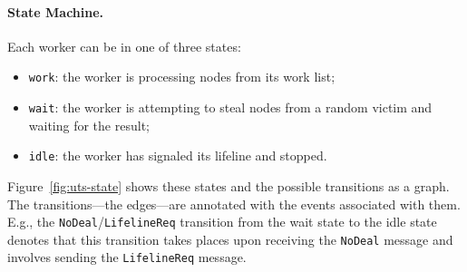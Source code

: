 \paragraph{State Machine.} Each worker can be in one of three states:
\begin{itemize}
\item \lstinline{work}: the worker is processing nodes from its work list;
\item \lstinline{wait}: the worker is attempting to steal nodes from a random victim and waiting for the result;
\item \lstinline{idle}: the worker has signaled its lifeline and stopped.
\end{itemize}
Figure~\ref{fig:uts-state} shows these states and the possible transitions as a
graph. The transitions---the edges---are annotated with the events associated
with them. E.g., the \lstinline{NoDeal}/\lstinline{LifelineReq} transition from
the wait state to the idle state denotes that this transition takes places upon
receiving the \lstinline{NoDeal} message and involves sending the \lstinline{LifelineReq}
message.
